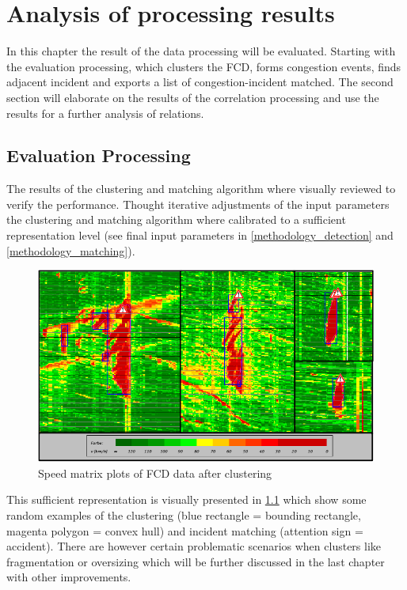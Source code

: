 \chapter{Analysis of processing results}
\label{analysis_processing}
In this chapter the result of the data processing will be evaluated. Starting with the evaluation processing, which clusters the FCD, forms congestion events, finds adjacent incident and exports a list of congestion-incident matched. The second section will elaborate on the results of the correlation processing and use the results for a further analysis of relations.

\section{Evaluation Processing}
\label{analysis_processing_evaluation}
The results of the clustering and matching algorithm where visually reviewed to verify the performance. Thought iterative adjustments of the input parameters the clustering and matching algorithm where calibrated to a sufficient representation level (see final input parameters in \cref{methodology_detection} and \cref{methodology_matching}).
\begin{figure}[ht!]
	\centering
	\includegraphics[scale=0.9]{images/cluster_final.png}
	\caption{Speed matrix plots of FCD data after clustering}
	\label{img:speedMatrixPlot_final_good}
\end{figure}
This sufficient representation is visually presented in \cref{img:speedMatrixPlot_final_good} which show some random examples of the clustering (blue rectangle = bounding rectangle, magenta polygon = convex hull) and incident matching (attention sign = accident). There are however certain problematic scenarios when clusters like fragmentation or oversizing which will be further discussed in the last chapter with other improvements.

